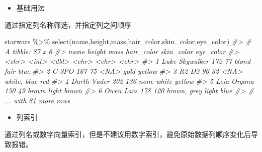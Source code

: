 \documentclass[
]{book}
\newenvironment{Shaded}{\begin{snugshade}}{\end{snugshade}}
\newcommand{\CommentTok}[1]{\textcolor[rgb]{0.56,0.35,0.01}{\textit{#1}}}
\newcommand{\FunctionTok}[1]{\textcolor[rgb]{0.00,0.00,0.00}{#1}}
\newcommand{\NormalTok}[1]{#1}
\newcommand{\SpecialCharTok}[1]{\textcolor[rgb]{0.00,0.00,0.00}{#1}}
\providecommand{\tightlist}{%
  \setlength{\itemsep}{0pt}\setlength{\parskip}{0pt}}
\begin{document}
\begin{itemize}
\tightlist
\item
  基础用法
\end{itemize}

通过指定列名称筛选，并指定列之间顺序

\begin{Shaded}
\begin{Highlighting}[]
\NormalTok{starwars }\SpecialCharTok{\%\textgreater{}\%} 
  \FunctionTok{select}\NormalTok{(name,height,mass,hair\_color,skin\_color,eye\_color)}
\CommentTok{\#\textgreater{} \# A tibble: 87 x 6}
\CommentTok{\#\textgreater{}   name           height  mass hair\_color  skin\_color  eye\_color}
\CommentTok{\#\textgreater{}   \textless{}chr\textgreater{}           \textless{}int\textgreater{} \textless{}dbl\textgreater{} \textless{}chr\textgreater{}       \textless{}chr\textgreater{}       \textless{}chr\textgreater{}    }
\CommentTok{\#\textgreater{} 1 Luke Skywalker    172    77 blond       fair        blue     }
\CommentTok{\#\textgreater{} 2 C{-}3PO             167    75 \textless{}NA\textgreater{}        gold        yellow   }
\CommentTok{\#\textgreater{} 3 R2{-}D2              96    32 \textless{}NA\textgreater{}        white, blue red      }
\CommentTok{\#\textgreater{} 4 Darth Vader       202   136 none        white       yellow   }
\CommentTok{\#\textgreater{} 5 Leia Organa       150    49 brown       light       brown    }
\CommentTok{\#\textgreater{} 6 Owen Lars         178   120 brown, grey light       blue     }
\CommentTok{\#\textgreater{} \# ... with 81 more rows}
\end{Highlighting}
\end{Shaded}

\begin{itemize}
\tightlist
\item
  列索引
\end{itemize}

通过列名或数字向量索引，但是不建议用数字索引，避免原始数据列顺序变化后导致报错。
\end{document}
